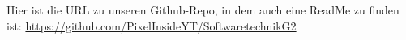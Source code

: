 Hier ist die URL zu unseren Github-Repo, in dem auch eine ReadMe zu finden ist: \url{https://github.com/PixelInsideYT/SoftwaretechnikG2}